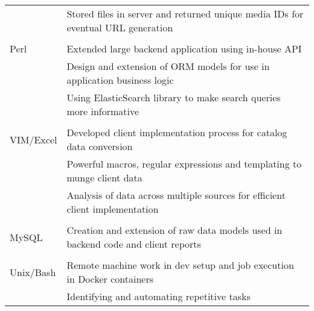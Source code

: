 \documentclass[12pt]{article}
\begin{document}
\begin{description}
\begin{description}
\begin{tabular}{l|l}
                                   & Stored files in server and returned unique media IDs for eventual URL generation\\
                                     \\
                        Perl   & Extended large backend application using in-house API \\
                                   & Design and extension of ORM models for use in application business logic \\
                                   & Using ElasticSearch library to make search queries more informative\\
                                     \\
                        VIM/Excel  & Developed client implementation process for catalog data conversion\\
                                   & Powerful macros, regular expressions and templating to munge client data\\
                                   & Analysis of data across multiple sources for efficient client implementation\\
                                     \\
                        MySQL      & Creation and extension of raw data models used in backend code and client reports\\
                                     \\
                        Unix/Bash  & Remote machine work in dev setup and job execution in Docker containers\\
                                   & Identifying and automating repetitive tasks
                    \end{tabular}

            \end{description}


\end{description}
\end{document}
